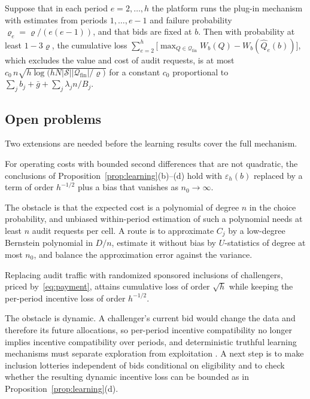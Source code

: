 \documentclass[opre,dblanonrev]{informs4}
\providecommand{\1}{\mathbf{1}}
\begin{document}
\begin{corollary}\label{cor:cumulative}
Suppose that in each period $e=2,\ldots,h$ the platform runs the plug-in mechanism with estimates from periods $1,\ldots,e-1$ and failure probability $\varrho_e=\varrho/(e(e-1))$, and that bids are fixed at $b$. Then with probability at least $1-3\varrho$, the cumulative loss $\sum_{e=2}^h\bigl[\max_{Q\in\mathcal Q_{\mathrm{fin}}}W_b(Q)-W_b(\hat Q_e(b))\bigr]$, which excludes the value and cost of audit requests, is at most $c_0\,n\sqrt{h\log\bigl(hN|\mathcal S||\mathcal Q_{\mathrm{fin}}|/\varrho\bigr)}$ for a constant $c_0$ proportional to $\sum_jb_j+\bar g+\sum_j\lambda_jn/B_j$.
\end{corollary}

\subsection{Open problems}\label{sec:learning-open}

Two extensions are needed before the learning results cover the full mechanism.

\begin{conjecture}\label{conj:convex}
For operating costs with bounded second differences that are not quadratic, the conclusions of Proposition~\ref{prop:learning}(b)--(d) hold with $\varepsilon_h(b)$ replaced by a term of order $h^{-1/2}$ plus a bias that vanishes as $n_0\to\infty$.
\end{conjecture}

The obstacle is that the expected cost is a polynomial of degree $n$ in the choice probability, and unbiased within-period estimation of such a polynomial needs at least $n$ audit requests per cell. A route is to approximate $C_j$ by a low-degree Bernstein polynomial in $D/n$, estimate it without bias by $U$-statistics of degree at most $n_0$, and balance the approximation error against the variance.

\begin{conjecture}\label{conj:funded}
Replacing audit traffic with randomized sponsored inclusions of challengers, priced by~\eqref{eq:payment}, attains cumulative loss of order $\sqrt h$ while keeping the per-period incentive loss of order $h^{-1/2}$.
\end{conjecture}

The obstacle is dynamic. A challenger's current bid would change the data and therefore its future allocations, so per-period incentive compatibility no longer implies incentive compatibility over periods, and deterministic truthful learning mechanisms must separate exploration from exploitation \citep{babaioff2014characterizing}. A next step is to make inclusion lotteries independent of bids conditional on eligibility and to check whether the resulting dynamic incentive loss can be bounded as in Proposition~\ref{prop:learning}(d).
\end{document}
